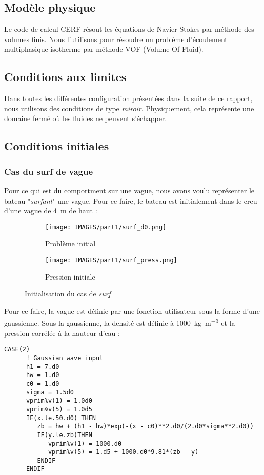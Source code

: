 \documentclass[../main.tex]{subfiles}
\begin{document}
\subsection{Modèle physique}

Le code de calcul CERF résout les équations de Navier-Stokes par méthode des volumes finis.
Nous l'utilisons pour résoudre un problème d'écoulement multiphasique isotherme par méthode VOF (Volume Of Fluid).



\subsection{Conditions aux limites}

Dans toutes les différentes configuration présentées dans la suite de ce rapport, nous utilisons des conditions de type \textit{miroir}.
Physiquement, cela représente une domaine fermé où les fluides ne peuvent s'échapper.





\subsection{Conditions initiales}

\subsubsection{Cas du surf de vague}
Pour ce qui est du comportment sur une vague, nous avons voulu représenter le bateau "\textit{surfant}" une vague. Pour ce faire, le bateau est initialement dans le creu d'une vague de \qty{4}{\meter} de haut :
\begin{figure}[H]
\centering
\begin{subfigure}[b]{11.7cm}
    \centering
    \texttt{[image: IMAGES/part1/surf\_d0.png]}
    \caption{Problème initial}
\end{subfigure}
\vfill
\begin{subfigure}[b]{11cm}
    \centering
    \texttt{[image: IMAGES/part1/surf\_press.png]}
    \caption{Pression initiale}
\end{subfigure}
\caption{Initialisation du cas de \textit{surf}}
\end{figure}

Pour ce faire, la vague est définie par une fonction utilisateur sous la forme d'une gaussienne. Sous la gaussienne, la densité est définie à \qty{1000}{\kilo\g\per\cubic\meter} et la pression corrélée à la hauteur d'eau :
\begin{lstlisting}[style=f90, caption={Fonction utilisateur pour le cas de \textit{surf}}, captionpos=b]
    CASE(2)
      ! Gaussian wave input
      h1 = 7.d0
      hw = 1.d0
      c0 = 1.d0
      sigma = 1.5d0
      vprim%v(1) = 1.0d0
      vprim%v(5) = 1.0d5
      IF(x.le.50.d0) THEN
         zb = hw + (h1 - hw)*exp(-(x - c0)**2.d0/(2.d0*sigma**2.d0))
         IF(y.le.zb)THEN
            vprim%v(1) = 1000.d0
            vprim%v(5) = 1.d5 + 1000.d0*9.81*(zb - y)
         ENDIF
      ENDIF
\end{lstlisting}
\end{document}

